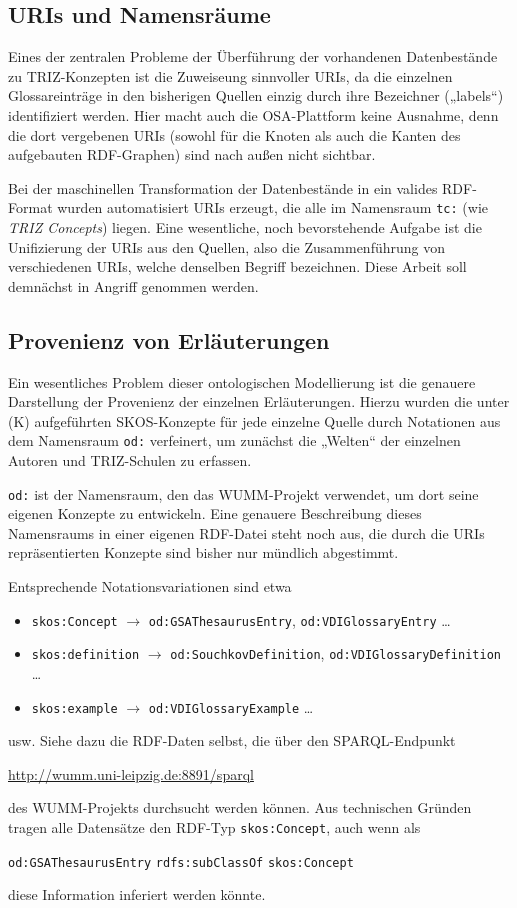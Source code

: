 \documentclass[11pt,a4paper]{article}
\begin{document}
\subsection{URIs und Namensräume}

Eines der zentralen Probleme der Überführung der vorhandenen Datenbestände zu
TRIZ-Konzepten ist die Zuweiseung sinnvoller URIs, da die einzelnen
Glossareinträge in den bisherigen Quellen einzig durch ihre Bezeichner
(„labels“) identifiziert werden.  Hier macht auch die OSA-Plattform keine
Ausnahme, denn die dort vergebenen URIs (sowohl für die Knoten als auch die
Kanten des aufgebauten RDF-Graphen) sind nach außen nicht sichtbar.

Bei der maschinellen Transformation der Datenbestände in ein valides
RDF-Format wurden automatisiert URIs erzeugt, die alle im Namensraum
\texttt{tc:} (wie \emph{TRIZ Concepts}) liegen. Eine wesentliche, noch
bevorstehende Aufgabe ist die Unifizierung der URIs aus den Quellen, also die
Zusammenführung von verschiedenen URIs, welche denselben Begriff bezeichnen.
Diese Arbeit soll demnächst in Angriff genommen werden. 

\subsection{Provenienz von Erläuterungen}

Ein wesentliches Problem dieser ontologischen Modellierung ist die genauere
Darstellung der Provenienz der einzelnen Erläuterungen. Hierzu wurden die
unter (K) aufgeführten SKOS-Konzepte für jede einzelne Quelle durch Notationen
aus dem Namensraum \texttt{od:} verfeinert, um zunächst die „Welten“ der
einzelnen Autoren und TRIZ-Schulen zu erfassen.

\texttt{od:} ist der Namensraum, den das WUMM-Projekt verwendet, um dort seine
eigenen Konzepte zu entwickeln.  Eine genauere Beschreibung dieses Namensraums
in einer eigenen RDF-Datei steht noch aus, die durch die URIs repräsentierten
Konzepte sind bisher nur mündlich abgestimmt.

Entsprechende Notationsvariationen sind etwa
\begin{itemize}[noitemsep]
\item \texttt{skos:Concept} $\to$ \texttt{od:GSAThesaurusEntry},
  \texttt{od:VDIGlossaryEntry} \ldots
\item \texttt{skos:definition} $\to$ \texttt{od:SouchkovDefinition},
  \texttt{od:VDIGlossaryDefinition} \ldots
\item \texttt{skos:example} $\to$ \texttt{od:VDIGlossaryExample} \ldots
\end{itemize}
usw. Siehe dazu die RDF-Daten selbst, die über den SPARQL-Endpunkt
\begin{center}
  \url{http://wumm.uni-leipzig.de:8891/sparql}
\end{center}
des WUMM-Projekts durchsucht werden können. Aus technischen Gründen tragen
alle Datensätze den RDF-Typ \texttt{skos:Concept}, auch wenn als 
\begin{center}
  \texttt{od:GSAThesaurusEntry} \texttt{rdfs:subClassOf} \texttt{skos:Concept}
\end{center}
diese Information inferiert werden könnte. 
\end{document}
